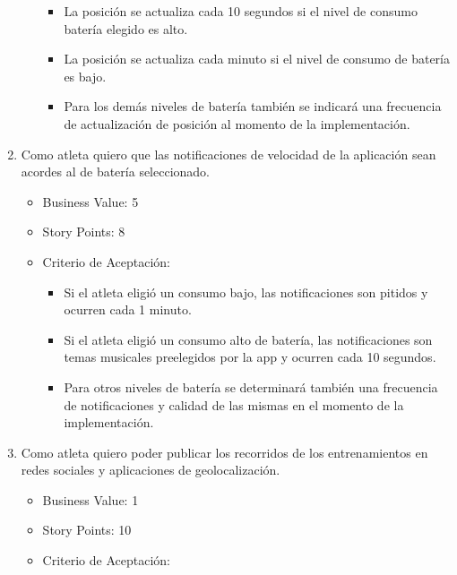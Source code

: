 \begin{enumerate}
\begin{itemize}
    \begin{itemize}
    \itemsep1pt\parskip0pt
    \item
      La posición se actualiza cada 10 segundos si el nivel de consumo
      batería elegido es alto.
    \item
      La posición se actualiza cada minuto si el nivel de consumo de
      batería es bajo.
    \item
      Para los demás niveles de batería también se indicará una
      frecuencia de actualización de posición al momento de la
      implementación.
    \end{itemize}
  \end{itemize}
\item
  Como atleta quiero que las notificaciones de velocidad de la
  aplicación sean acordes al de batería seleccionado.

  \begin{itemize}
  \itemsep1pt\parskip0pt
  \item
    Business Value: 5
  \item
    Story Points: 8
  \item
    Criterio de Aceptación:

    \begin{itemize}
    \itemsep1pt\parskip0pt
    \item
      Si el atleta eligió un consumo bajo, las notificaciones son
      pitidos y ocurren cada 1 minuto.
    \item
      Si el atleta eligió un consumo alto de batería, las notificaciones
      son temas musicales preelegidos por la app y ocurren cada 10
      segundos.
    \item
      Para otros niveles de batería se determinará también una
      frecuencia de notificaciones y calidad de las mismas en el momento
      de la implementación.
    \end{itemize}
  \end{itemize}
\item
  Como atleta quiero poder publicar los recorridos de los entrenamientos
  en redes sociales y aplicaciones de geolocalización.

  \begin{itemize}
  \itemsep1pt\parskip0pt
  \item
    Business Value: 1
  \item
    Story Points: 10
  \item
    Criterio de Aceptación:


\end{itemize}
\end{enumerate}
